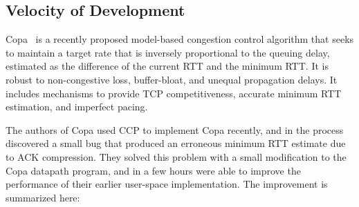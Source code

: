


\subsection{Velocity of Development}
\label{s:capabilities:velocity}

Copa~\cite{copa} is a recently proposed model-based congestion control algorithm that seeks to maintain a target rate that is inversely proportional to the queuing delay, estimated as the difference of the current RTT and the minimum RTT.
It is robust to non-congestive loss, buffer-bloat, and unequal propagation delays. It includes mechanisms to provide TCP competitiveness, accurate minimum RTT estimation, and imperfect pacing.

The authors of Copa used CCP to implement Copa recently, and in the process discovered a small bug that produced an erroneous minimum RTT estimate due to ACK compression. They solved this problem with a small modification to the Copa datapath program,
and in a few hours were able to improve the performance of their earlier user-space implementation. The improvement is summarized here:

